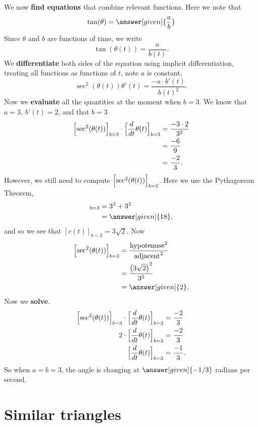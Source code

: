 \documentclass{ximera}
\begin{document}
\begin{example}
\begin{explanation}
    We now \textbf{find equations} that combine relevant
    functions. Here we note that
    \[
    \tan(\theta) = \answer[given]{\frac{a}{b}}
    \]
    Since $\theta$ and $b$ are functions of time, we write
    \[
    \tan(\theta(t)) = \frac{a}{b(t)}.
    \]
    We \textbf{differentiate}  both sides of  the equation using
    implicit differentiation, treating all functions as functions of
    $t$, note $a$ is constant,
    \[
    \sec^2(\theta(t))\theta'(t) = \frac{-a\cdot b'(t)}{b(t)^2}.
    \]
    Now we \textbf{evaluate} all the quantities at the moment when $b=3$.  We
    know that $a=3$, $b'(t) = 2$, and that $b = 3$
    \begin{align*}
    \Bigl[\sec^2(\theta(t))\Bigr]_{b=3}\cdot \Bigl[\dfrac{d}{dt}\theta(t)\Bigr]_{b=3} &= \frac{-3\cdot 2}{3^2}\\
    &= \frac{-6}{9}\\
    &= \frac{-2}{3}.
    \end{align*}
    However, we still need to compute $ \Bigl[\sec^2(\theta(t))\Bigr]_{b=3}$. Here we use the
    Pythagorean Theorem,
    \begin{align*}
    [c^2(t)]_{b=3} &= 3^2 + 3^2\\
    &=\answer[given]{18},
    \end{align*}
    and so we see that $[c(t)]_{b=3} = 3\sqrt{2}$. Now
    \begin{align*}
     \Bigl[\sec^2(\theta(t))\Bigr]_{b=3} &= \frac{\mathrm{hypotenuse}^2}{\mathrm{adjacent}^2}\\
      &= \frac{\left(3\sqrt{2}\right)^2}{3^2}\\
      &= \answer[given]{2}.
    \end{align*}
   Now we \textbf{solve}.
    \begin{align*}
    \Bigl[\sec^2(\theta(t))\Bigr]_{b=3}\cdot \Bigl[\dfrac{d}{dt}\theta(t)\Bigr]_{b=3}  &= \frac{-2}{3}\\
      2\cdot \Bigl[\dfrac{d}{dt}\theta(t)\Bigr]_{b=3}  &= \frac{-2}{3}\\
     \Bigl[\dfrac{d}{dt}\theta(t)\Bigr]_{b=3} &= \frac{-1}{3}.
    \end{align*}
    So when $a=b=3$, the angle is changing at $\answer[given]{-1/3}$
    radians per second.
  \end{explanation}
\end{example}



\section{Similar triangles}
\end{document}
